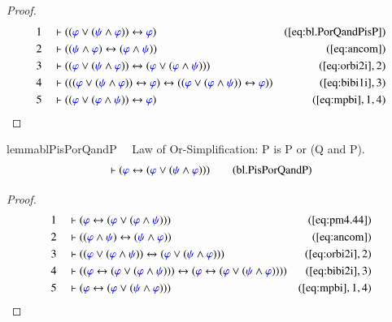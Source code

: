 \begin{proof}
\begin{align}
  1 &&  & \vdash ( ( \mw{\varphi} \vee ( \mw{\psi} \wedge \mw{\varphi} ) )
      \leftrightarrow \mw{\varphi}
      )&(\mbox{\ref{eq:bl.PorQandPisP}})\notag
  \\ 2 &&  & \vdash ( ( \mw{\psi} \wedge \mw{\varphi} ) \leftrightarrow (
      \mw{\varphi} \wedge \mw{\psi} )
      )&(\mbox{\ref{eq:ancom}})\notag
  \\ 3 &&  & \vdash ( ( \mw{\varphi} \vee ( \mw{\psi} \wedge \mw{\varphi} ) )
      \leftrightarrow ( \mw{\varphi} \vee ( \mw{\varphi}
      \wedge \mw{\psi} ) )
      )&(\mbox{\ref{eq:orbi2i}},2)\notag
  \\ 4 &&  & \vdash ( ( ( \mw{\varphi} \vee ( \mw{\psi} \wedge \mw{\varphi} ) )
      \leftrightarrow \mw{\varphi} ) \leftrightarrow ( (
      \mw{\varphi} \vee ( \mw{\varphi} \wedge \mw{\psi} ) )
      \leftrightarrow \mw{\varphi} )
      )&(\mbox{\ref{eq:bibi1i}},3)\notag
  \\ 5 &&  & \vdash ( ( \mw{\varphi} \vee ( \mw{\varphi} \wedge \mw{\psi} ) )
      \leftrightarrow \mw{\varphi}
      )&(\mbox{\ref{eq:mpbi}},1,4)\notag
\end{align}
\end{proof}

\begin{restatable}{lemma}{blPisPorQandP}~~ Law of Or-Simplification: P is P or
(Q and P).
\begin{align}
\vdash ( \mw{\varphi} \leftrightarrow ( \mw{\varphi} \vee ( \mw{\psi} \wedge
    \mw{\varphi} ) ) )\label{eq:bl.PisPorQandP}\tag{bl.PisPorQandP}
\end{align}
\end{restatable}

\begin{proof}
\begin{align}
  1 &&  & \vdash ( \mw{\varphi} \leftrightarrow ( \mw{\varphi} \vee (
      \mw{\varphi} \wedge \mw{\psi} ) )
      )&(\mbox{\ref{eq:pm4.44}})\notag
  \\ 2 &&  & \vdash ( ( \mw{\varphi} \wedge \mw{\psi} ) \leftrightarrow (
      \mw{\psi} \wedge \mw{\varphi} )
      )&(\mbox{\ref{eq:ancom}})\notag
  \\ 3 &&  & \vdash ( ( \mw{\varphi} \vee ( \mw{\varphi} \wedge \mw{\psi} ) )
      \leftrightarrow ( \mw{\varphi} \vee ( \mw{\psi}
      \wedge \mw{\varphi} ) )
      )&(\mbox{\ref{eq:orbi2i}},2)\notag
  \\ 4 &&  & \vdash ( ( \mw{\varphi} \leftrightarrow ( \mw{\varphi} \vee (
      \mw{\varphi} \wedge \mw{\psi} ) ) ) \leftrightarrow (
      \mw{\varphi} \leftrightarrow ( \mw{\varphi} \vee (
      \mw{\psi} \wedge \mw{\varphi} ) ) )
      )&(\mbox{\ref{eq:bibi2i}},3)\notag
  \\ 5 &&  & \vdash ( \mw{\varphi} \leftrightarrow ( \mw{\varphi} \vee (
      \mw{\psi} \wedge \mw{\varphi} ) )
      )&(\mbox{\ref{eq:mpbi}},1,4)\notag
\end{align}
\end{proof}


